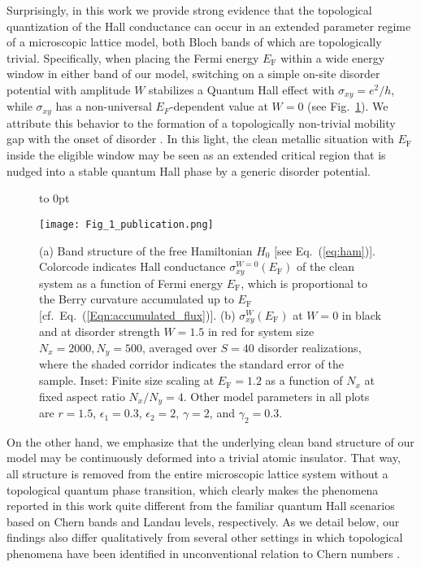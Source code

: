 \documentclass[aps,prb,amsmath,amssymb,twocolumn, superscriptaddress]{revtex4-2}
\newcommand{\eq}[1]{Eq.~(\ref{#1})}
\begin{document}
Surprisingly, in this work we provide strong evidence that the topological quantization of the Hall conductance can occur in an extended parameter regime of a microscopic lattice model, both Bloch bands of which are topologically trivial. Specifically, when placing the Fermi energy $E_\mathrm{F}$ within a wide energy window in either band of our model, switching on a simple on-site disorder potential with amplitude $W$ stabilizes a Quantum Hall effect with $\sigma_{xy} = e^2/h$, while $\sigma_{xy}$ has a non-universal $E_F$-dependent value at $W=0$ (see Fig.~\ref{fig:one}). We attribute this behavior to the formation of a topologically non-trivial mobility gap with the onset of disorder \cite{Anderson_localization, Scaling_theory, Wegner, Wegner, 2D_Anderson_localization, AL_review}. In this light, the clean metallic situation with $E_\mathrm{F}$ inside the eligible window may be seen as an extended critical region that is nudged into a stable quantum Hall phase by a generic disorder potential.
 
\begin{figure}[htp!]	 
{
    \vbox to 0pt {
            \raggedright
            \textcolor{white}{
            }
        }
}
{\texttt{[image: Fig\_1\_publication.png]}}
\caption{(a) Band structure of the free Hamiltonian $\hat H_0$ [see \eq{eq:ham}]. Colorcode indicates Hall conductance $\sigma_{xy}^{W=0}(E_\mathrm{F})$ of the clean system as a function of Fermi energy $E_\mathrm{F}$, which is proportional to the Berry curvature accumulated up to $E_\mathrm{F}$ [cf.~\eq{Eqn:accumulated_flux}]. (b) $\sigma_{xy}^{W}(E_\mathrm{F})$ at $W = 0$ in black and at disorder strength $W = 1.5$ in red for system size $N_x = 2000, N_y = 500$, averaged over $S=40$ disorder realizations, where the shaded corridor indicates the standard error of the sample. Inset: Finite size scaling at $E_\mathrm{F} = 1.2$ as a function of $N_x$ at fixed aspect ratio $N_x/N_y=4$. Other model parameters in all plots are $r = 1.5$, $\epsilon_1 = 0.3$, $\epsilon_2 = 2$, $\gamma  =2$, and $\gamma_2 = 0.3$.
 }\label{fig:one}
\end{figure}

On the other hand, we emphasize that the underlying clean band structure of our model may be continuously deformed into a trivial atomic insulator. That way, all structure is removed from the entire microscopic lattice system without a topological quantum phase transition, which clearly makes the phenomena reported in this work quite different from the familiar quantum Hall scenarios based on Chern bands and Landau levels, respectively. As we detail below, our findings also differ qualitatively from several other settings in which topological phenomena have been identified in unconventional relation to Chern numbers \cite{TAI, theory_TAI, Mobility_gap_TAI, Anomalous_BBC, Anomalous_Floquet_AI, Floquet_levitation, Fine_structure}.
\end{document}
